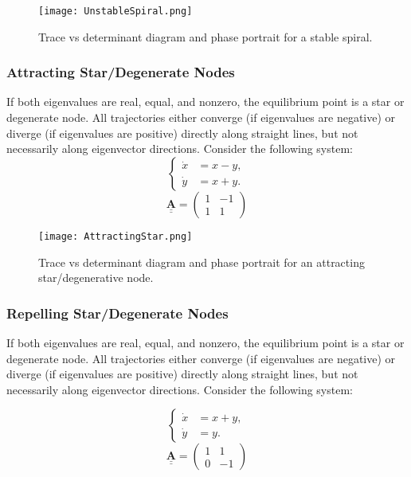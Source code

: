 \documentclass{amsbook}
\begin{document}
\begin{figure}[H]
    \centering
    \texttt{[image: UnstableSpiral.png]}
    \caption{Trace vs determinant diagram and phase portrait for a stable spiral.}
    \label{fig:UnstableSpiral}
\end{figure}

\subsubsection{\textbf{Attracting Star/Degenerate Nodes}}
If both eigenvalues are real, equal, and nonzero, the equilibrium point is a star or degenerate node. All trajectories either converge (if eigenvalues are negative) or diverge (if eigenvalues are positive) directly along straight lines, but not necessarily along eigenvector directions. Consider the following system:
$$
\begin{cases}
\dot{x} &= x - y, \\
\dot{y} &= x + y.
\end{cases}
$$
$$
\underline{\underline{\mathbf{A}}} = \begin{pmatrix} 1 & -1 \\ 1 & 1 \end{pmatrix}
$$
\begin{figure}[H]
    \centering
    \texttt{[image: AttractingStar.png]}
    \caption{Trace vs determinant diagram and phase portrait for an attracting star/degenerative node.}
    \label{fig:AttractingStar}
\end{figure}

\subsubsection{\textbf{Repelling Star/Degenerate Nodes}}
If both eigenvalues are real, equal, and nonzero, the equilibrium point is a star or degenerate node. All trajectories either converge (if eigenvalues are negative) or diverge (if eigenvalues are positive) directly along straight lines, but not necessarily along eigenvector directions. Consider the following system:

$$
\begin{cases}
\dot{x} &= x + y, \\
\dot{y} &= y.
\end{cases}
$$
$$
\underline{\underline{\mathbf{A}}} = \begin{pmatrix} 1 & 1 \\ 0 & -1 \end{pmatrix}
$$
\end{document}
